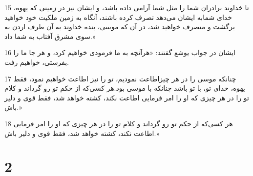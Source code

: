 \par 15 تا خداوند برادران شما را مثل شما آرامی داده باشد، و ایشان نیز در زمینی که یهوه، خدای شمابه ایشان می‌دهد تصرف کرده باشند، آنگاه به زمین ملکیت خود خواهید برگشت و متصرف خواهید شد، در آن که موسی، بنده خداوند به آن طرف اردن به سوی مشرق آفتاب به شما داد.»
\par 16 ایشان در جواب یوشع گفتند: «هر‌آنچه به ما فرمودی خواهیم کرد، و هر جا ما را بفرستی، خواهیم رفت.
\par 17 چنانکه موسی را در هر چیزاطاعت نمودیم، تو را نیز اطاعت خواهیم نمود، فقط یهوه، خدای تو، با تو باشد چنانکه با موسی بود.هر کسی‌که از حکم تو رو گرداند و کلام تو را در هر چیزی که او را امر فرمایی اطاعت نکند، کشته خواهد شد، فقط قوی و دلیر باش.»
\par 18 هر کسی‌که از حکم تو رو گرداند و کلام تو را در هر چیزی که او را امر فرمایی اطاعت نکند، کشته خواهد شد، فقط قوی و دلیر باش.»
 
\chapter{2}

